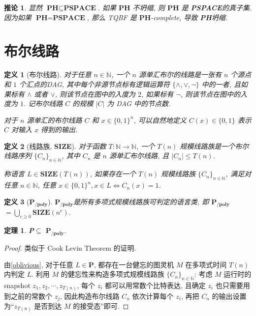 \documentclass[8pt]{article}
\theoremstyle{compact}
\newtheorem{theorem}{定理}[section]
\newtheorem{definition}{定义}[section]
\newtheorem{corollary}{推论}[section]
\def\le{\leqslant}
\def\ge{\geqslant}
\def\P{\textbf{P}}
\def\PSPACE{\textbf{PSPACE}}
\def\PH{\textbf{PH}}
\def\SIZE{\textbf{SIZE}}
\def\PPOLY{$\textbf{P}_{\textbf{/poly}}$}
\begin{document}
\begin{corollary}
	显然 $\PH \subseteq \PSPACE$. 如果 $\PH$ 不坍缩, 则 $\PH$ 是 \PSPACE 的真子集. 因为如果 $\PH = \PSPACE$, 那么 \textsf{TQBF} 是 $\PH$-complete, 导致 \PH 坍缩.
\end{corollary}

\section{布尔线路}
\begin{definition}[布尔线路]
	对于任意 $n \in \mathbb N$, 一个 $n$ 源单汇布尔的线路是一张有 $n$ 个源点和 $1$ 个汇点的DAG, 其中每个非源节点标有逻辑运算符 $\{\wedge, \vee, \lnot\}$ 中的一者, 且如果标有 $\wedge$ 或者 $\vee$, 则该节点在图中的入度为 $2$, 如果标有 $\lnot$, 则该节点在图中的入度为 $1$. 记布尔线路 $C$ 的规模 $|C|$ 为 DAG 中的节点数.

	对于 $n$ 源单汇的布尔线路 $C$ 和 $x \in \{0, 1\}^n$, 可以自然地定义 $C(x) \in \{0, 1\}$ 表示 $C$ 对输入 $x$ 得到的输出. 
\end{definition}
\begin{definition}[线路族, \SIZE]
	对于函数 $T : \mathbb N \to \mathbb N$, 一个 $T(n)$ 规模线路族是一个布尔线路序列 $\{C_n\}_{n \in \mathbb N}$, 其中 $C_n$ 是 $n$ 源单汇布尔线路, 且 $|C_n| \le T(n)$.

	称语言 $L \in \SIZE(T(n))$, 如果存在一个 $T(n)$ 规模线路族 $\{C_n\}_{n \in \mathbb N}$, 满足对任意 $n \in \mathbb N$, 任意 $x \in \{0, 1\}^n, x \in L \Leftrightarrow C_n(x) = 1$.
\end{definition}
\begin{definition}[\PPOLY]
	\PPOLY 是所有多项式规模线路族可判定的语言类, 即 \PPOLY $ = \bigcup_{c \ge 0} \SIZE(n^c)$.
\end{definition}
\begin{theorem}
	\P $\subseteq$ \PPOLY.
	\label{P_subset_PPOLY}
\end{theorem}
\begin{proof}
	类似于 Cook Levin Theorem 的证明.

	由\cref{oblivious}, 对于任意 $L \in \P$, 都存在一台健忘的图灵机 $M$ 在多项式时间 $T(n)$ 内判定 $L$. 利用 $M$ 的健忘性来构造多项式规模线路族 $\{C_n\}_{n \in \mathbb N}$: 考虑 $M$ 运行时的 snapshot $z_1, z_2, \cdots, z_{T(n)}$, 每个 $z_i$ 都可以用常数个比特表达, 且确定 $z_i$ 也只需要用到之前的常数个 $z_j$, 因此构造布尔线路 $C_n$ 依次计算每个 $z_i$, 再把 $C_n$ 的输出设置为“$z_{T(n)}$ 是否到达 $M$ 的接受态”即可.
\end{proof}
\end{document}

